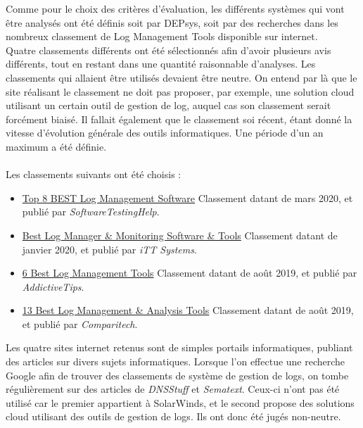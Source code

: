\documentclass[paper=a4, fontsize=11pt]{scrartcl}
\begin{document}
Comme pour le choix des critères d'évaluation, les différents systèmes qui vont être analysés ont été définis soit par DEPsys, soit par des recherches dans les nombreux classement de \og Log Management Tools \fg disponible sur internet.\\
Quatre classements différents ont été sélectionnés afin d'avoir plusieurs avis différents, tout en restant dans une quantité raisonnable d'analyses. Les classements qui allaient être utilisés devaient être neutre. On entend par là que le site réalisant le classement ne doit pas proposer, par exemple, une solution cloud utilisant un certain outil de gestion de log, auquel cas son classement serait forcément biaisé. Il fallait également que le classement soi récent, étant donné la vitesse d'évolution générale des outils informatiques. Une période d'un an maximum a été définie.\\\\
Les classements suivants ont été choisis :
\begin{itemize}
    \item \href{https://www.softwaretestinghelp.com/log-management-software/}{Top 8 BEST Log Management Software}
    \subitem Classement datant de mars 2020, et publié par \textit{SoftwareTestingHelp}.
    \item \href{https://www.ittsystems.com/log-manager-software-and-tools/}{Best Log Manager \& Monitoring Software \& Tools}
    \subitem Classement datant de janvier 2020, et publié par \textit{iTT Systems}.
    \item \href{https://www.addictivetips.com/net-admin/linux-log-management-tools/}{6 Best Log Management Tools}
    \subitem Classement datant de août 2019, et publié par \textit{AddictiveTips}.
    \item \href{https://www.comparitech.com/net-admin/log-management-tools/}{13 Best Log Management \& Analysis Tools}
    \subitem Classement datant de août 2019, et publié par \textit{Comparitech}.
\end{itemize}

Les quatre sites internet retenus sont de simples portails informatiques, publiant des articles sur divers sujets informatiques. Lorsque l'on effectue une recherche Google afin de trouver des classements de système de gestion de logs, on tombe régulièrement sur des articles de \textit{DNSStuff} et \textit{Sematext}. Ceux-ci n'ont pas été utilisé car le premier appartient à SolarWinds, et le second propose des solutions cloud utilisant des outils de gestion de logs. Ils ont donc été jugés non-neutre.
\end{document}
